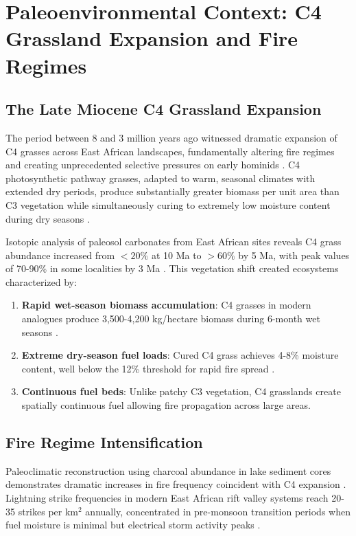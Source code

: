 \documentclass[12pt,a4paper]{article}
\begin{document}
\section{Paleoenvironmental Context: C4 Grassland Expansion and Fire Regimes}
\subsection{The Late Miocene C4 Grassland Expansion}

The period between 8 and 3 million years ago witnessed dramatic expansion of C4 grasses across East African landscapes, fundamentally altering fire regimes and creating unprecedented selective pressures on early hominids \citep{cerling1997global,kingston2007shifting}. C4 photosynthetic pathway grasses, adapted to warm, seasonal climates with extended dry periods, produce substantially greater biomass per unit area than C3 vegetation while simultaneously curing to extremely low moisture content during dry seasons \citep{edwards2010trajectory}.

Isotopic analysis of paleosol carbonates from East African sites reveals C4 grass abundance increased from $<20\%$ at 10 Ma to $>60\%$ by 5 Ma, with peak values of 70-90\% in some localities by 3 Ma \citep{cerling2011woody}. This vegetation shift created ecosystems characterized by:

\begin{enumerate}
\item \textbf{Rapid wet-season biomass accumulation}: C4 grasses in modern analogues produce 3,500-4,200 kg/hectare biomass during 6-month wet seasons \citep{scholes2008tree}.
\item \textbf{Extreme dry-season fuel loads}: Cured C4 grass achieves 4-8\% moisture content, well below the 12\% threshold for rapid fire spread \citep{trollope2004fire}.
\item \textbf{Continuous fuel beds}: Unlike patchy C3 vegetation, C4 grasslands create spatially continuous fuel allowing fire propagation across large areas.
\end{enumerate}

\subsection{Fire Regime Intensification}

Paleoclimatic reconstruction using charcoal abundance in lake sediment cores demonstrates dramatic increases in fire frequency coincident with C4 expansion \citep{bobe2002faunal,bonnefille2010cenozoic}. Lightning strike frequencies in modern East African rift valley systems reach 20-35 strikes per km$^2$ annually, concentrated in pre-monsoon transition periods when fuel moisture is minimal but electrical storm activity peaks \citep{christian2003global}.
\end{document}
